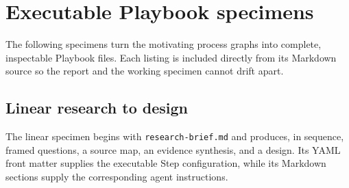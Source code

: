 \documentclass[11pt]{article}
\newcommand{\artifact}[1]{\texttt{#1}}
\begin{document}
\clearpage
\appendix
\section{Executable Playbook specimens}

The following specimens turn the motivating process graphs into complete,
inspectable Playbook files. Each listing is included directly from its Markdown
source so the report and the working specimen cannot drift apart.

\subsection{Linear research to design}

The linear specimen begins with \artifact{research-brief.md} and produces, in
sequence, framed questions, a source map, an evidence synthesis, and a design.
Its YAML front matter supplies the executable Step configuration, while its
Markdown sections supply the corresponding agent instructions.


\end{document}
